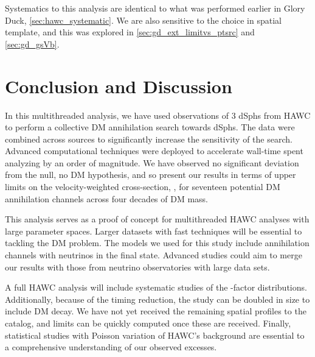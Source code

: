 Systematics to this analysis are identical to what was performed earlier in Glory Duck, \cref{sec:hawc_systematic}.
We are also sensitive to the choice in spatial template, and this was explored in \cref{sec:gd_ext_limitvs_ptsrc} and \cref{sec:gd_gsVb}.

\section{Conclusion and Discussion}\label{sec:mtd_conclusion}

In this multithreaded analysis, we have used observations of 3 dSphs from HAWC to perform a collective DM annihilation search towards dSphs.
The data were combined across sources to significantly increase the sensitivity of the search.
Advanced computational techniques were deployed to accelerate wall-time spent analyzing by an order of magnitude.
We have observed no significant deviation from the null, no DM hypothesis, and so present our results in terms of upper limits on the velocity-weighted cross-section, \sv, for seventeen potential DM annihilation channels across four decades of DM mass.

This analysis serves as a proof of concept for multithreaded HAWC analyses with large parameter spaces.
Larger datasets with fast techniques will be essential to tackling the DM problem.
The models we used for this study include annihilation channels with neutrinos in the final state.
Advanced studies could aim to merge our results with those from neutrino observatories with large data sets.

A full HAWC analysis will include systematic studies of the \J-factor distributions.
Additionally, because of the timing reduction, the study can be doubled in size to include DM decay.
We have not yet received the remaining spatial profiles to the \LS catalog, and limits can be quickly computed once these are received.
Finally, statistical studies with Poisson variation of HAWC's background are essential to a comprehensive understanding of our observed excesses.